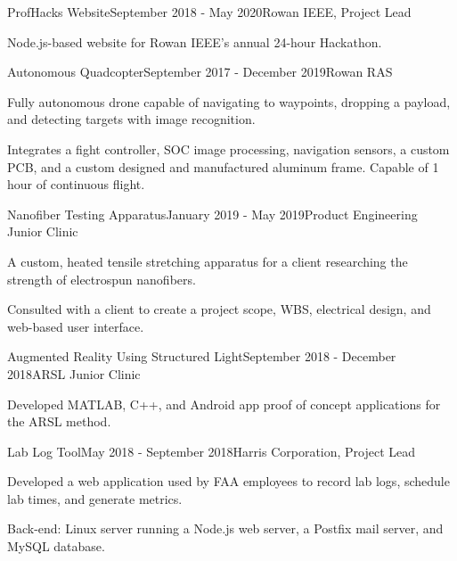{  %

  \begin{rSubsection}{ProfHacks Website}{September 2018 - May 2020}{Rowan IEEE, Project Lead}{}
  \item Node.js-based website for Rowan IEEE's annual 24-hour Hackathon.
  \end{rSubsection}


  \begin{rSubsection}{Autonomous Quadcopter}{September 2017 - December 2019}{Rowan
    RAS}{}
  \item Fully autonomous drone capable of navigating to waypoints, dropping a
    payload, and detecting targets with image recognition.
  \item Integrates a fight controller, SOC image processing, navigation sensors,
    a custom PCB, and a custom designed and manufactured aluminum frame. Capable
    of 1 hour of continuous flight.
  \end{rSubsection}


  \begin{rSubsection}{Nanofiber Testing Apparatus}{January 2019 - May 2019}{Product Engineering Junior Clinic}{}
  \item A custom, heated tensile stretching apparatus for a client researching the strength of electrospun nanofibers.
  \item Consulted with a client to create a project scope, WBS, electrical
    design, and web-based user interface.
  \end{rSubsection}


  \begin{rSubsection}{Augmented Reality Using Structured Light}{September
    2018 - December 2018}{ARSL Junior Clinic}{}
  \item Developed MATLAB, C++, and Android app proof of concept applications for the ARSL method.
  \end{rSubsection}


  \begin{rSubsection}{Lab Log Tool}{May 2018 - September 2018}{Harris Corporation, Project Lead}{}
  \item Developed a web application used by FAA employees to record lab logs, schedule lab times, and generate metrics.
  \item Back-end: Linux server running a Node.js web server, a Postfix mail server, and MySQL database.
  \end{rSubsection}

}

